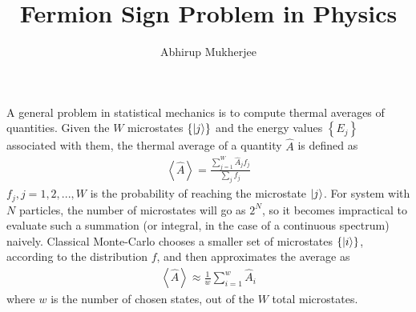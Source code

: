 \documentclass{article}
\numberwithin{equation}{section}
\begin{document}
\title{Fermion Sign Problem in Physics}
\author{Abhirup Mukherjee}
\date{}
\maketitle
A general problem in statistical mechanics is to compute thermal averages of quantities. Given the \(W\) microstates \(\left\{ \ket{j} \right\} \) and the energy values \(\left\{ E_j \right\} \) associated with them, the thermal average of a quantity \(\hat A\) is defined as
\begin{equation}\begin{aligned}
	\left<\hat A \right> = \frac{\sum_{j=1}^W \hat A_j f_j}{\sum_j f_j}
\end{aligned}\end{equation}
\(f_j, j=1,2,...,W\) is the probability of reaching the microstate \(\ket{j}\). For system with \(N\) particles, the number of microstates will go as \(2^N\), so it becomes impractical to evaluate such a summation (or integral, in the case of a continuous spectrum) naively. Classical Monte-Carlo chooses a smaller set of microstates \(\left\{ \ket{i} \right\} \), according to the distribution \(f\), and then approximates the average as
\begin{equation}\begin{aligned}
	\left<\hat A \right> \approx \frac{1}{w}\sum_{i=1}^w \hat A_i
\end{aligned}\end{equation}
where \(w\) is the number of chosen states, out of the \(W\) total microstates.
\end{document}

